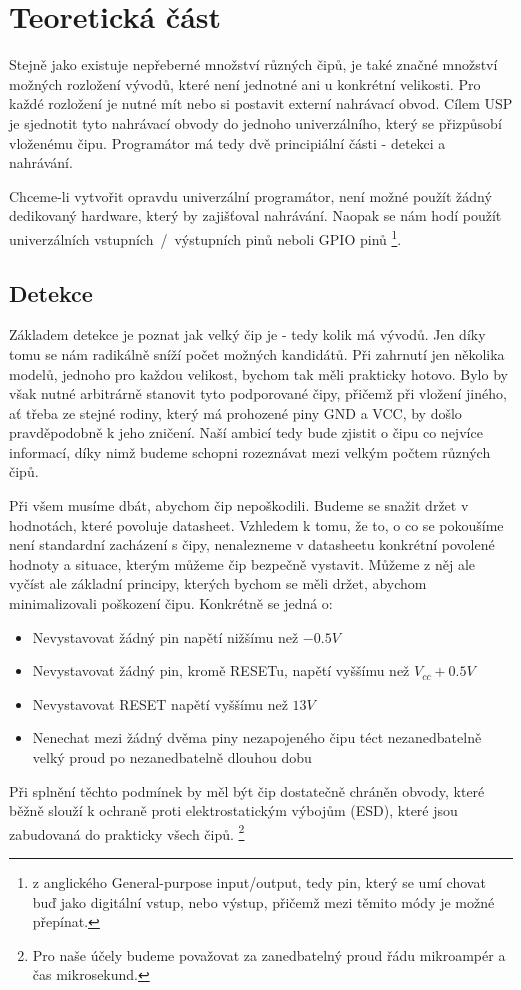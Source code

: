 \documentclass[11pt,a4paper,twoside,openright]{report}
\begin{document}


\setcounter{tocdepth}{2}
\tableofcontents

\chapter{Teoretická část}
\pagestyle{fancy}

Stejně jako existuje nepřeberné množství různých čipů, je také značné množství možných rozložení vývodů, které není jednotné ani u konkrétní velikosti. Pro každé rozložení je nutné mít nebo si postavit externí nahrávací obvod. Cílem USP je sjednotit tyto nahrávací obvody do jednoho univerzálního, který se přizpůsobí vloženému čipu. Programátor má tedy dvě principiální části - detekci a nahrávání. 

Chceme-li vytvořit opravdu univerzální programátor, není možné použít žádný dedikovaný hardware, který by zajišťoval nahrávání. Naopak se nám hodí použít univerzálních vstupních~/~výstupních pinů neboli GPIO pinů \footnote{z anglického General-purpose input/output, tedy pin, který se umí chovat buď jako digitální vstup, nebo výstup, přičemž mezi těmito módy je možné přepínat.}.

\section{Detekce}

Základem detekce je poznat jak velký čip je - tedy kolik má vývodů. Jen díky tomu se nám radikálně sníží počet možných kandidátů. Při zahrnutí jen několika modelů, jednoho pro každou velikost, bychom tak měli prakticky hotovo. Bylo by však nutné arbitrárně stanovit tyto podporované čipy, přičemž při vložení jiného, ať třeba ze stejné rodiny, který má prohozené piny GND a VCC, by došlo pravděpodobně k jeho zničení. Naší ambicí tedy bude zjistit o čipu co nejvíce informací, díky nimž budeme schopni rozeznávat mezi velkým počtem různých čipů.

Při všem musíme dbát, abychom čip nepoškodili. Budeme se snažit držet v hodnotách, které povoluje datasheet. Vzhledem k tomu, že to, o co se pokoušíme není standardní zacházení s čipy, nenalezneme v datasheetu konkrétní povolené hodnoty a situace, kterým můžeme čip bezpečně vystavit. Můžeme z něj ale vyčíst ale základní principy, kterých bychom se měli držet, abychom minimalizovali poškození čipu. Konkrétně se jedná o:
\begin{itemize}
	\item Nevystavovat žádný pin napětí nižšímu než $-0.5V$
	\item Nevystavovat žádný pin, kromě RESETu, napětí vyššímu než ${V}_{cc} + 0.5V$
	\item Nevystavovat RESET napětí vyššímu než $13V$
	\item Nenechat mezi žádný dvěma piny nezapojeného čipu téct nezanedbatelně velký proud po nezanedbatelně dlouhou dobu
\end{itemize}
Při splnění těchto podmínek by měl být čip dostatečně chráněn obvody, které běžně slouží k ochraně proti elektrostatickým výbojům (ESD), které jsou zabudovaná do prakticky všech čipů. \footnote{Pro naše účely budeme považovat za zanedbatelný proud řádu mikroampér a čas mikrosekund.}
\end{document}
